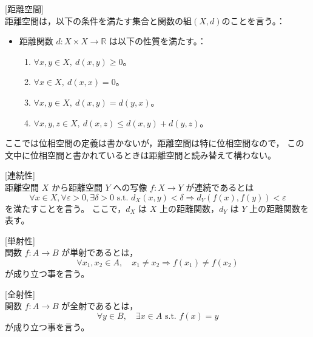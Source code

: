 \documentclass[uplatex]{jsarticle}
\begin{document}
\begin{definition}\label{Def:metric space}[距離空間]\\
    距離空間は，以下の条件を満たす集合と関数の組$(X, d)$のことを言う。：
    \begin{itemize}
        \item 距離関数 $d : X \times X \to \mathbb{R}$ は以下の性質を満たす。：
              \begin{enumerate}
                  \item $\forall x, y \in X, \ d(x, y) \geq 0$。
                  \item $\forall x \in X, \ d(x, x) = 0$。
                  \item $\forall x, y \in X, \ d(x, y) = d(y, x)$。
                  \item $\forall x, y, z \in X, \ d(x, z) \leq d(x, y) + d(y, z)$。
              \end{enumerate}
    \end{itemize}
    ここでは位相空間の定義は書かないが，距離空間は特に位相空間なので，
    この文中に位相空間と書かれているときは距離空間と読み替えて構わない。
\end{definition}

\begin{definition}\label{Def:continuity}[連続性]\\
    距離空間 \(X\) から距離空間 \(Y\) への写像 \(f: X \rightarrow Y\) が連続であるとは
    \[
        \forall x \in X, \forall \varepsilon > 0, \exists \delta > 0 \text{  s.t.  } d_X(x, y) < \delta \Rightarrow d_Y(f(x), f(y)) < \varepsilon
    \]
    を満たすことを言う。
    ここで，\(d_X\) は \(X\) 上の距離関数，\(d_Y\) は \(Y\) 上の距離関数を表す。

\end{definition}

\begin{definition}\label{Def:injection}[単射性]\\
    関数 \(f: A \rightarrow B\) が単射であるとは，
    \[
        \forall x_1, x_2 \in A, \quad x_1 \neq x_2 \Rightarrow f(x_1) \neq f(x_2)
    \]
    が成り立つ事を言う。
\end{definition}

\begin{definition}\label{Def:surjection}[全射性]\\
    関数 \(f: A \rightarrow B\) が全射であるとは，
    \[
        \forall y \in B, \quad \exists x \in A \text{  s.t.  } f(x) = y
    \]
    が成り立つ事を言う。
\end{definition}
\end{document}
